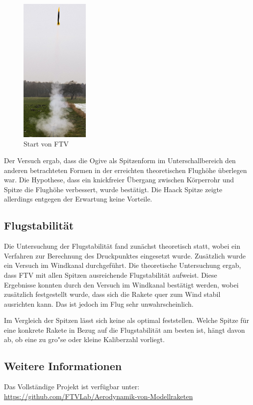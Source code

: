 \documentclass[11pt,a4paper]{article}
\begin{document}
\vspace{-10pt}
\begin{figure}
	\vspace{-11pt}
	\centering
	\includegraphics[width=0.3\textwidth]{Bilder/Flugversuch-Start.jpg}
	\caption{Start von FTV}
\end{figure}

Der Versuch ergab, dass die Ogive als Spitzenform im Unterschallbereich den anderen betrachteten Formen in der erreichten theoretischen Flughöhe überlegen war. Die Hypothese, dass ein knickfreier Übergang zwischen Körperrohr und Spitze die Flughöhe verbessert, wurde bestätigt. Die Haack Spitze zeigte allerdings entgegen der Erwartung keine Vorteile.  


\vspace{-5pt}
\subsection*{Flugstabilität}
\vspace{-10pt}

Die Untersuchung der Flugstabilität fand zunächst theoretisch statt, wobei ein Verfahren zur Berechnung des Druckpunktes eingesetzt wurde. Zusätzlich wurde ein Versuch im Windkanal durchgeführt.
Die theoretische Untersuchung ergab, dass FTV mit allen Spitzen ausreichende Flugstabilität aufweist. Diese Ergebnisse konnten durch den Versuch im Windkanal bestätigt werden, wobei zusätzlich festgestellt wurde, dass sich die Rakete quer zum Wind stabil ausrichten kann. Das ist jedoch im Flug sehr unwahrscheinlich.

Im Vergleich der Spitzen lässt sich keine als optimal feststellen. Welche Spitze für eine konkrete Rakete in Bezug auf die Flugstabilität am besten ist, hängt davon ab, ob eine zu gro"se oder kleine Kaliberzahl vorliegt.


\vspace{-5pt}
\subsection*{Weitere Informationen}
\vspace{-10pt}

Das Vollständige Projekt ist verfügbar unter: \\
\url{https://github.com/FTVLab/Aerodynamik-von-Modellraketen}
\end{document}
